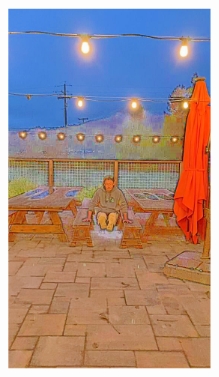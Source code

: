 \documentclass[letterpaper,12pt]{article}
\begin{document}
\begin{figure}[htbp]
\begin{subfigure}{0.128\textwidth}
			\includegraphics[width=\linewidth]{LoLi-Phone-imgT_1/Retinex-Net}
			\captionsetup{font=scriptsize}
			\caption{}
			\label{fig: LoLi-Phone-imgT_1_d}
		\end{subfigure}
		\begin{subfigure}{0.128\textwidth}

\end{subfigure}
\end{figure}
\end{document}
